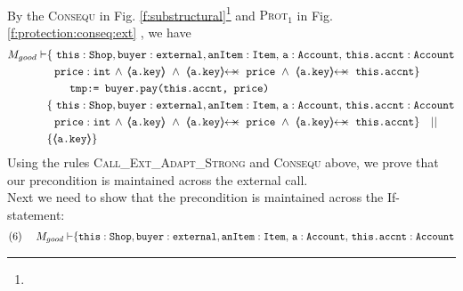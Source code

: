 \begin{proofO}
\normalsize
\\

By the \textsc{Consequ} in Fig. \ref{f:substructural}\footnote{}
 and \textsc{Prot$_1$} in Fig. \ref{f:protection:conseq:ext} , we have
\small
\begin{align*}
M_{good} \vdash & \{ \ \prg{this}:\prg{Shop}, \prg{buyer} : \prg{external}, \prg{anItem} : \prg{Item},\, \prg{a}:\prg{Account},\, \prg{this.accnt}:\prg{Account}\\
				& \ \ \prg{price} : \prg{int} \,
				  \wedge\, 
				  {\inside{\prg{a.key}}}\ \wedge\ 
				  \protectedFrom{\prg{a.key}}{\prg{price}}\ \wedge\ 
				   \protectedFrom{\prg{a.key}}{\prg{this.accnt}}\} \\
		  		& \SPT \prg{tmp:= buyer.pay(this.accnt, price)}\ \\  
		  		& \{ \  \prg{this}:\prg{Shop}, \prg{buyer} : \prg{external}, \prg{anItem} : \prg{Item},\, \prg{a}:\prg{Account},\, \prg{this.accnt}:\prg{Account}\\
				& \ \ \prg{price} : \prg{int}\,
				  \wedge\, 
				  {\inside{\prg{a.key}}}\ \wedge\ 
				  \protectedFrom{\prg{a.key}}{\prg{price}}\ \wedge\ 
				   \protectedFrom{\prg{a.key}}{\prg{this.accnt}}\} \ \ \  || \ \ \ \\
		  		& \{ {\inside{\prg{a.key}}} \}
\end{align*}
\normalsize
Using the rules \textsc{Call\_Ext\_Adapt\_Strong} and \textsc{Consequ} above, we prove that our precondition is maintained across the external call. 
\\
Next we need to show that the precondition is maintained across the If-statement:
\small
\begin{align*}
\text{(6)}  \ \ \ \ M_{good} \vdash & \{  \prg{this}:\prg{Shop}, \prg{buyer} : \prg{external}, \prg{anItem} : \prg{Item},\, \prg{a}:\prg{Account},\, \prg{this.accnt}:\prg{Account}\\

\end{align*}
\end{proofO}
